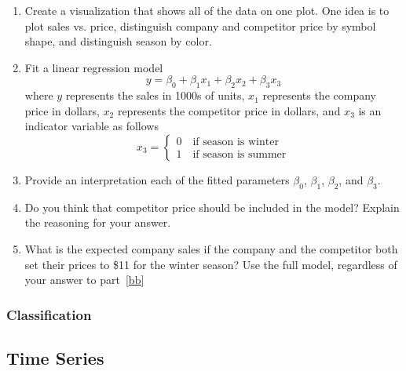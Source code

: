 \begin{enumerate}
\begin{enumerate}
\item Create a visualization that shows all of the data on one plot.
  One idea is to plot sales vs. price, distinguish company and competitor
  price by symbol shape, and distinguish season by color.
  \item Fit a linear regression model 
\[
y = \beta_0 + \beta_1x_1 + \beta_2x_2 + \beta_3x_3
\]
where $y$ represents the sales in 1000s of units, $x_1$ represents
the company price in dollars, $x_2$ represents the competitor price in
dollars, and $x_3$ is an indicator variable as follows
\[
x_3 = \begin{cases} 0 \quad \text{if season is winter} \\
1 \quad \text{if season is summer}
\end{cases}
\]
\item Provide an interpretation each of the fitted parameters $\beta_0$, $\beta_1$,
  $\beta_2$, and $\beta_3$. \label{aa}
\item Do you think that competitor price should be included in the
  model?  Explain the reasoning for your answer. \label{bb}
\item What is the expected company sales if the company and the
  competitor both set their prices to \$11 for the winter season?  Use
  the full model, regardless of your answer to
  part~\ref{bb} \label{cc}
\end{enumerate}

\subsubsection*{Classification}

\subsection*{Time Series}
  
\end{enumerate}
